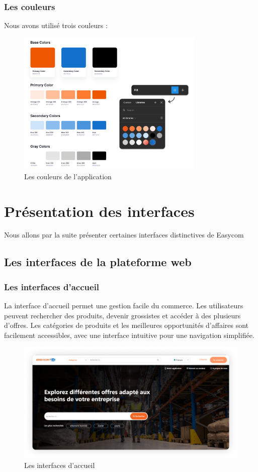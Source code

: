 \documentclass[edit,12pt,a4paper,ChapStyle,oneside,doubleinterligne]{report}
\begin{document}
\subsubsection{Les couleurs }
Nous avons utilisé trois couleurs :
  \begin{figure} [H]
    \centering
    \includegraphics[width=0.8\textwidth]{images/Colors.png}
    \caption{Les couleurs de l'application}
    \label{fig:colors}
\end{figure}



\section{Présentation des interfaces }
Nous allons par la suite présenter certaines interfaces distinctives de Easycom
\subsection{Les interfaces de la plateforme web}
\subsubsection{Les interfaces d'accueil}
La interface d'accueil permet une gestion facile du commerce. Les utilisateurs peuvent rechercher des produits, devenir grossistes et accéder à des plusieurs d'offres. Les catégories de produits et les meilleures opportunités d'affaires sont facilement accessibles, avec une interface intuitive pour une navigation simplifiée.
  \begin{figure} [H]
    \centering
    \includegraphics[width=1\textwidth]{images/home 1.png}
    \caption{Les interfaces d'accueil}
    \label{fig:colors}
\end{figure}
\end{document}
